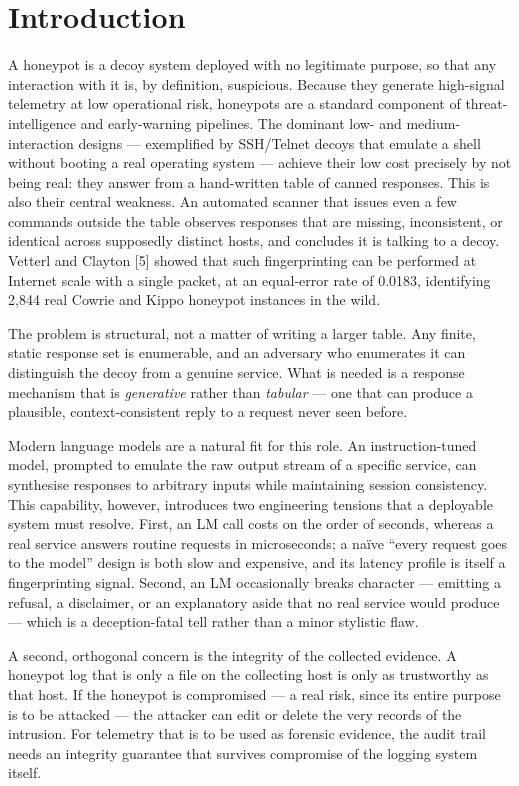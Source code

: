 \documentclass[conference]{IEEEtran}
\begin{document}
\section{Introduction}

A honeypot is a decoy system deployed with no legitimate purpose, so that any interaction with it is, by definition, suspicious. Because they generate high-signal telemetry at low operational risk, honeypots are a standard component of threat-intelligence and early-warning pipelines. The dominant low- and medium-interaction designs --- exemplified by SSH/Telnet decoys that emulate a shell without booting a real operating system --- achieve their low cost precisely by not being real: they answer from a hand-written table of canned responses. This is also their central weakness. An automated scanner that issues even a few commands outside the table observes responses that are missing, inconsistent, or identical across supposedly distinct hosts, and concludes it is talking to a decoy. Vetterl and Clayton [5] showed that such fingerprinting can be performed at Internet scale with a single packet, at an equal-error rate of 0.0183, identifying 2,844 real Cowrie and Kippo honeypot instances in the wild.

The problem is structural, not a matter of writing a larger table. Any finite, static response set is enumerable, and an adversary who enumerates it can distinguish the decoy from a genuine service. What is needed is a response mechanism that is \emph{generative} rather than \emph{tabular} --- one that can produce a plausible, context-consistent reply to a request never seen before.

Modern language models are a natural fit for this role. An instruction-tuned model, prompted to emulate the raw output stream of a specific service, can synthesise responses to arbitrary inputs while maintaining session consistency. This capability, however, introduces two engineering tensions that a deployable system must resolve. First, an LM call costs on the order of seconds, whereas a real service answers routine requests in microseconds; a naïve ``every request goes to the model'' design is both slow and expensive, and its latency profile is itself a fingerprinting signal. Second, an LM occasionally breaks character --- emitting a refusal, a disclaimer, or an explanatory aside that no real service would produce --- which is a deception-fatal tell rather than a minor stylistic flaw.

A second, orthogonal concern is the integrity of the collected evidence. A honeypot log that is only a file on the collecting host is only as trustworthy as that host. If the honeypot is compromised --- a real risk, since its entire purpose is to be attacked --- the attacker can edit or delete the very records of the intrusion. For telemetry that is to be used as forensic evidence, the audit trail needs an integrity guarantee that survives compromise of the logging system itself.
\end{document}
